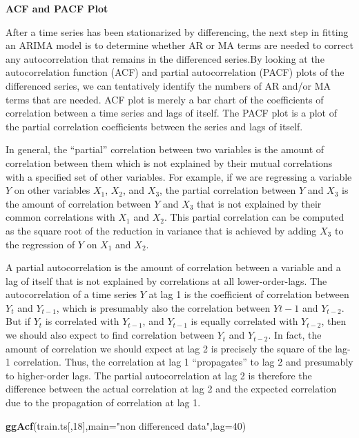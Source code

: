 \documentclass[12pt,openany]{book}
\newenvironment{Shaded}{\begin{snugshade}}{\end{snugshade}}
\newcommand{\DataTypeTok}[1]{\textcolor[rgb]{0.13,0.29,0.53}{#1}}
\newcommand{\DecValTok}[1]{\textcolor[rgb]{0.00,0.00,0.81}{#1}}
\newcommand{\KeywordTok}[1]{\textcolor[rgb]{0.13,0.29,0.53}{\textbf{#1}}}
\newcommand{\NormalTok}[1]{#1}
\newcommand{\StringTok}[1]{\textcolor[rgb]{0.31,0.60,0.02}{#1}}
\begin{document}
\textbf{ACF and PACF Plot}

After a time series has been stationarized by differencing, the next step in fitting an ARIMA model is to determine whether AR or MA terms are needed to correct any autocorrelation that remains in the differenced series.By looking at the autocorrelation function (ACF) and partial autocorrelation (PACF) plots of the differenced series, we can tentatively identify the numbers of AR and/or MA terms that are needed. ACF plot is merely a bar chart of the coefficients of correlation between a time series and lags of itself. The PACF plot is a plot of the partial correlation coefficients between the series and lags of itself.

In general, the ``partial'' correlation between two variables is the amount of correlation between them which is not explained by their mutual correlations with a specified set of other variables. For example, if we are regressing a variable \(Y\) on other variables \(X_1\), \(X_2\), and \(X_3\), the partial correlation between \(Y\) and \(X_3\) is the amount of correlation between \(Y\) and \(X_3\) that is not explained by their common correlations with \(X_1\) and \(X_2\). This partial correlation can be computed as the square root of the reduction in variance that is achieved by adding \(X_3\) to the regression of \(Y\) on \(X_1\) and \(X_2\).

A partial autocorrelation is the amount of correlation between a variable and a lag of itself that is not explained by correlations at all lower-order-lags. The autocorrelation of a time series \(Y\) at lag 1 is the coefficient of correlation between \(Y_t\) and \(Y_{t-1}\), which is presumably also the correlation between \(Y{t-1}\) and \(Y_{t-2}\). But if \(Y_t\) is correlated with \(Y_{t-1}\), and \(Y_{t-1}\) is equally correlated with \(Y_{t-2}\), then we should also expect to find correlation between \(Y_t\) and \(Y_{t-2}\). In fact, the amount of correlation we should expect at lag 2 is precisely the square of the lag-1 correlation. Thus, the correlation at lag 1 ``propagates'' to lag 2 and presumably to higher-order lags. The partial autocorrelation at lag 2 is therefore the difference between the actual correlation at lag 2 and the expected correlation due to the propagation of correlation at lag 1.

\begin{Shaded}
\begin{Highlighting}[]
\KeywordTok{ggAcf}\NormalTok{(train.ts[,}\DecValTok{18}\NormalTok{],}\DataTypeTok{main=}\StringTok{"non differenced data"}\NormalTok{,}\DataTypeTok{lag=}\DecValTok{40}\NormalTok{)}
\end{Highlighting}
\end{Shaded}
\end{document}
